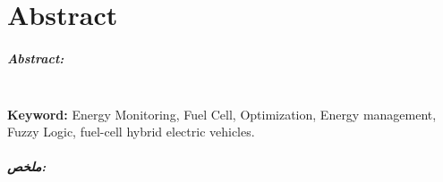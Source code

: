 \chapter*{Abstract}
{}

\small


\paragraph*{Abstract:}  \lipsum[1] \\
\textbf{Keyword:}  Energy Monitoring, Fuel Cell, Optimization, Energy management, Fuzzy Logic, fuel-cell hybrid electric vehicles.

	\begin{Arabic}
		\paragraph*{ملخص:}

\end{Arabic}
